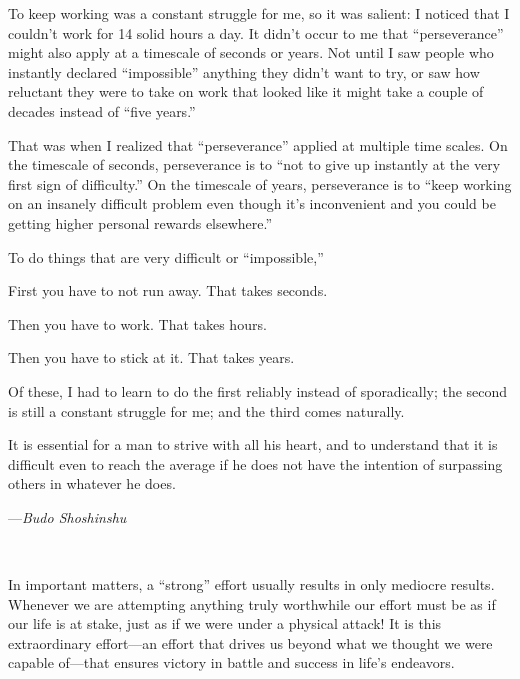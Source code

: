 {
 To keep working was a constant struggle for me, so it was salient:
I noticed that I couldn't work for 14 solid hours a
day. It didn't occur to me that
``perseverance'' might also apply at
a timescale of seconds or years. Not until I saw people who instantly
declared ``impossible'' anything
they didn't want to try, or saw how reluctant they were
to take on work that looked like it might take a couple of decades
instead of ``five years.''}

{
 That was when I realized that
``perseverance'' applied at multiple
time scales. On the timescale of seconds, perseverance is to
``not to give up instantly at the very first sign of
difficulty.'' On the timescale of years, perseverance
is to ``keep working on an insanely difficult problem
even though it's inconvenient and you could be getting
higher personal rewards elsewhere.''}

{
 To do things that are very difficult or
``impossible,''}

{
 First you have to not run away. That takes seconds.}

{
 Then you have to work. That takes hours.}

{
 Then you have to stick at it. That takes years.}

{
 Of these, I had to learn to do the first reliably instead of
sporadically; the second is still a constant struggle for me; and the
third comes naturally.}

\myendsectiontext


{
 It is essential for a man to strive with all his heart, and to
understand that it is difficult even to reach the average if he does
not have the intention of surpassing others in whatever he does.}

{\raggedleft
 {}---\textit{Budo Shoshinshu}
\par}


\bigskip

{
 ~}

{
 In important matters, a
``strong'' effort usually results in
only mediocre results. Whenever we are attempting anything truly
worthwhile our effort must be as if our life is at stake, just as if we
were under a physical attack! It is this extraordinary effort---an
effort that drives us beyond what we thought we were capable of---that
ensures victory in battle and success in life's
endeavors.}

